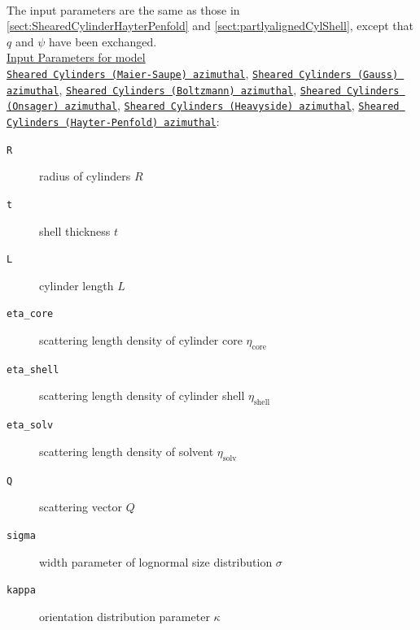 \hspace{1pt}\\
The input parameters are the same as those in \ref{sect:ShearedCylinderHayterPenfold} and \ref{sect:partlyalignedCylShell}, except that $q$ and $\psi$ have been exchanged.\\
\uline{Input Parameters for model}\\ \uline{\texttt{Sheared Cylinders (Maier-Saupe) azimuthal}}, \uline{\texttt{Sheared Cylinders (Gauss) azimuthal}}, \uline{\texttt{Sheared Cylinders (Boltzmann) azimuthal}}, \uline{\texttt{Sheared Cylinders (Onsager) azimuthal}}, \uline{\texttt{Sheared Cylinders (Heavyside) azimuthal}}, \uline{\texttt{Sheared Cylinders (Hayter-Penfold) azimuthal}}:\\
\begin{description}
\item[\texttt{R}] radius of cylinders $R$
\item[\texttt{t}] shell thickness $t$
\item[\texttt{L}] cylinder length $L$
\item[\texttt{eta\_core}] scattering length density of cylinder core $\eta_\mathrm{core}$
\item[\texttt{eta\_shell}] scattering length density of cylinder shell $\eta_\mathrm{shell}$
\item[\texttt{eta\_solv}] scattering length density of solvent $\eta_\mathrm{solv}$
\item[\texttt{Q}] scattering vector $Q$
\item[{\texttt{sigma}}] width parameter of lognormal size distribution $\sigma$
\item[{\texttt{kappa}}] orientation distribution parameter $\kappa$
\end{description}

\vspace{5mm}

